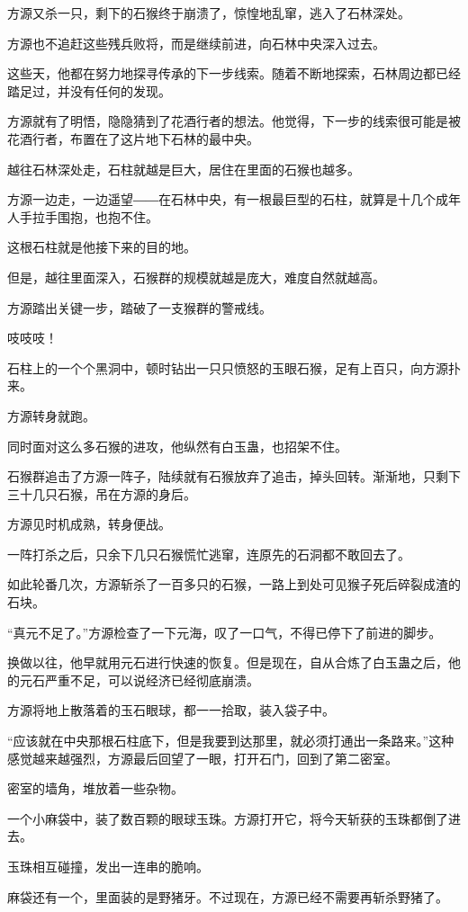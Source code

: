 \begin{this_body}
方源又杀一只，剩下的石猴终于崩溃了，惊惶地乱窜，逃入了石林深处。

方源也不追赶这些残兵败将，而是继续前进，向石林中央深入过去。

这些天，他都在努力地探寻传承的下一步线索。随着不断地探索，石林周边都已经踏足过，并没有任何的发现。

方源就有了明悟，隐隐猜到了花酒行者的想法。他觉得，下一步的线索很可能是被花酒行者，布置在了这片地下石林的最中央。

越往石林深处走，石柱就越是巨大，居住在里面的石猴也越多。

方源一边走，一边遥望――在石林中央，有一根最巨型的石柱，就算是十几个成年人手拉手围抱，也抱不住。

这根石柱就是他接下来的目的地。

但是，越往里面深入，石猴群的规模就越是庞大，难度自然就越高。

方源踏出关键一步，踏破了一支猴群的警戒线。

吱吱吱！

石柱上的一个个黑洞中，顿时钻出一只只愤怒的玉眼石猴，足有上百只，向方源扑来。

方源转身就跑。

同时面对这么多石猴的进攻，他纵然有白玉蛊，也招架不住。

石猴群追击了方源一阵子，陆续就有石猴放弃了追击，掉头回转。渐渐地，只剩下三十几只石猴，吊在方源的身后。

方源见时机成熟，转身便战。

一阵打杀之后，只余下几只石猴慌忙逃窜，连原先的石洞都不敢回去了。

如此轮番几次，方源斩杀了一百多只的石猴，一路上到处可见猴子死后碎裂成渣的石块。

“真元不足了。”方源检查了一下元海，叹了一口气，不得已停下了前进的脚步。

换做以往，他早就用元石进行快速的恢复。但是现在，自从合炼了白玉蛊之后，他的元石严重不足，可以说经济已经彻底崩溃。

方源将地上散落着的玉石眼球，都一一拾取，装入袋子中。

“应该就在中央那根石柱底下，但是我要到达那里，就必须打通出一条路来。”这种感觉越来越强烈，方源最后回望了一眼，打开石门，回到了第二密室。

密室的墙角，堆放着一些杂物。

一个小麻袋中，装了数百颗的眼球玉珠。方源打开它，将今天斩获的玉珠都倒了进去。

玉珠相互碰撞，发出一连串的脆响。

麻袋还有一个，里面装的是野猪牙。不过现在，方源已经不需要再斩杀野猪了。


\end{this_body}

